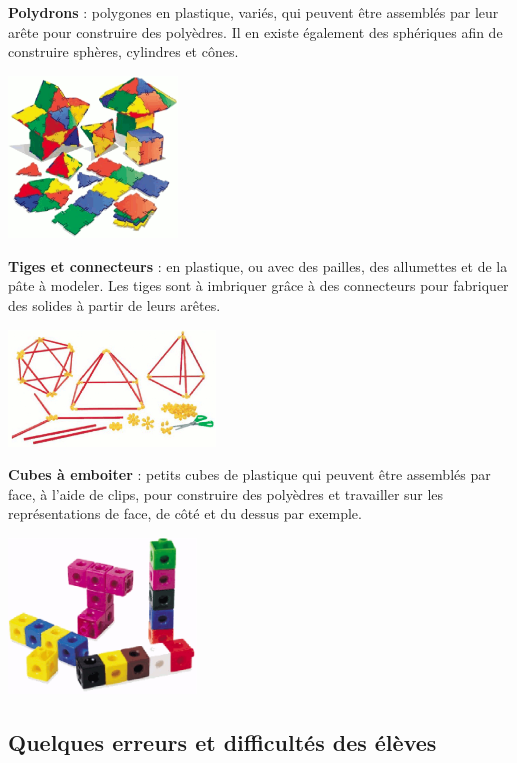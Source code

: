 {\bf Polydrons} : polygones en plastique, variés, qui peuvent être assemblés par leur arête pour construire des polyèdres. Il en existe également des sphériques afin de construire sphères, cylindres et cônes.
\begin{center}
   \includegraphics[width=4.5cm]{Geometrie_did/Images/Geo6_cours_polydrons}
\end{center}

{\bf Tiges et connecteurs} : en plastique, ou avec des pailles, des allumettes et de la pâte à modeler. Les tiges sont à imbriquer grâce à des connecteurs pour fabriquer des solides à partir de leurs arêtes.
\begin{center}
   \includegraphics[width=5.5cm]{Geometrie_did/Images/Geo6_cours_tiges}
\end{center}

{\bf Cubes à emboiter} : petits cubes de plastique qui peuvent être assemblés par face, à l'aide de clips, pour construire des polyèdres et travailler sur les représentations de face, de côté et du dessus par exemple.
\begin{center}
   \includegraphics[width=5cm]{Geometrie_did/Images/Geo6_cours_cubes}
\end{center}


\subsection{Quelques erreurs et difficultés des élèves} %


